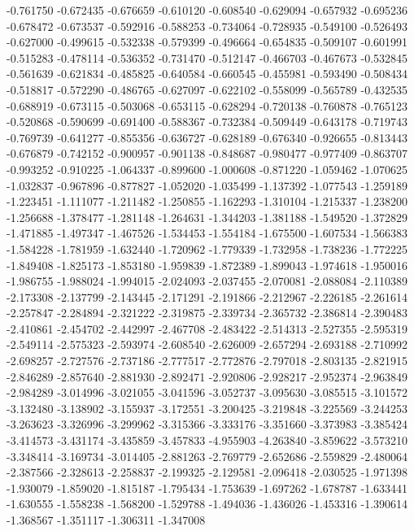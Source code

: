 -0.761750
-0.672435
-0.676659
-0.610120
-0.608540
-0.629094
-0.657932
-0.695236
-0.678472
-0.673537
-0.592916
-0.588253
-0.734064
-0.728935
-0.549100
-0.526493
-0.627000
-0.499615
-0.532338
-0.579399
-0.496664
-0.654835
-0.509107
-0.601991
-0.515283
-0.478114
-0.536352
-0.731470
-0.512147
-0.466703
-0.467673
-0.532845
-0.561639
-0.621834
-0.485825
-0.640584
-0.660545
-0.455981
-0.593490
-0.508434
-0.518817
-0.572290
-0.486765
-0.627097
-0.622102
-0.558099
-0.565789
-0.432535
-0.688919
-0.673115
-0.503068
-0.653115
-0.628294
-0.720138
-0.760878
-0.765123
-0.520868
-0.590699
-0.691400
-0.588367
-0.732384
-0.509449
-0.643178
-0.719743
-0.769739
-0.641277
-0.855356
-0.636727
-0.628189
-0.676340
-0.926655
-0.813443
-0.676879
-0.742152
-0.900957
-0.901138
-0.848687
-0.980477
-0.977409
-0.863707
-0.993252
-0.910225
-1.064337
-0.899600
-1.000608
-0.871220
-1.059462
-1.070625
-1.032837
-0.967896
-0.877827
-1.052020
-1.035499
-1.137392
-1.077543
-1.259189
-1.223451
-1.111077
-1.211482
-1.250855
-1.162293
-1.310104
-1.215337
-1.238200
-1.256688
-1.378477
-1.281148
-1.264631
-1.344203
-1.381188
-1.549520
-1.372829
-1.471885
-1.497347
-1.467526
-1.534453
-1.554184
-1.675500
-1.607534
-1.566383
-1.584228
-1.781959
-1.632440
-1.720962
-1.779339
-1.732958
-1.738236
-1.772225
-1.849408
-1.825173
-1.853180
-1.959839
-1.872389
-1.899043
-1.974618
-1.950016
-1.986755
-1.988024
-1.994015
-2.024093
-2.037455
-2.070081
-2.088084
-2.110389
-2.173308
-2.137799
-2.143445
-2.171291
-2.191866
-2.212967
-2.226185
-2.261614
-2.257847
-2.284894
-2.321222
-2.319875
-2.339734
-2.365732
-2.386814
-2.390483
-2.410861
-2.454702
-2.442997
-2.467708
-2.483422
-2.514313
-2.527355
-2.595319
-2.549114
-2.575323
-2.593974
-2.608540
-2.626009
-2.657294
-2.693188
-2.710992
-2.698257
-2.727576
-2.737186
-2.777517
-2.772876
-2.797018
-2.803135
-2.821915
-2.846289
-2.857640
-2.881930
-2.892471
-2.920806
-2.928217
-2.952374
-2.963849
-2.984289
-3.014996
-3.021055
-3.041596
-3.052737
-3.095630
-3.085515
-3.101572
-3.132480
-3.138902
-3.155937
-3.172551
-3.200425
-3.219848
-3.225569
-3.244253
-3.263623
-3.326996
-3.299962
-3.315366
-3.333176
-3.351660
-3.373983
-3.385424
-3.414573
-3.431174
-3.435859
-3.457833
-4.955903
-4.263840
-3.859622
-3.573210
-3.348414
-3.169734
-3.014405
-2.881263
-2.769779
-2.652686
-2.559829
-2.480064
-2.387566
-2.328613
-2.258837
-2.199325
-2.129581
-2.096418
-2.030525
-1.971398
-1.930079
-1.859020
-1.815187
-1.795434
-1.753639
-1.697262
-1.678787
-1.633441
-1.630555
-1.558238
-1.568200
-1.529788
-1.494036
-1.436026
-1.453316
-1.390614
-1.368567
-1.351117
-1.306311
-1.347008
